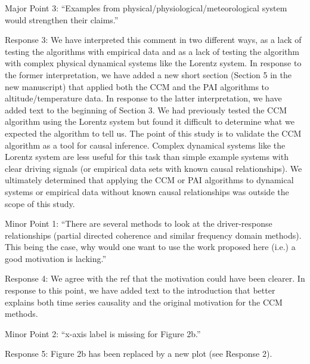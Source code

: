 \documentclass[]{article}
\begin{document}
Major Point 3: ``Examples from physical/physiological/meteorological system would strengthen their claims.''

Response 3:  We have interpreted this comment in two different ways, as a lack of testing the algorithms with empirical data and as a lack of testing the algorithm with complex physical dynamical systems like the Lorentz system.  In response to the former interpretation, we have added a new short section (Section 5 in the new manuscript) that applied both the CCM and the PAI algorithms to altitude/temperature data.  In response to the latter interpretation, we have added text to the beginning of Section 3.  We had previously tested the CCM algorithm using the Lorentz system but found it difficult to determine what we expected the algorithm to tell us.  The point of this study is to validate the CCM algorithm as a tool for causal inference.  Complex dynamical systems like the Lorentz system are less useful for this task than simple example systems with clear driving signals (or empirical data sets with known causal relationships).  We ultimately determined that applying the CCM or PAI algorithms to dynamical systems or empirical data without known causal relationships was outside the scope of this study.

Minor Point 1: ``There are several methods to look at the driver-response relationships (partial directed coherence and similar frequency domain methods).  This being the case, why would one want to use the work proposed here  (i.e.) a good motivation is lacking.''

Response 4:  We agree with the ref that the motivation could have been clearer.  In response to this point, we have added text to the introduction that better explains both time series causality and the original motivation for the CCM methods.

Minor Point 2:  ``x-axis label is missing for Figure 2b.''

Response 5:  Figure 2b has been replaced by a new plot (see Response 2).
\end{document}
